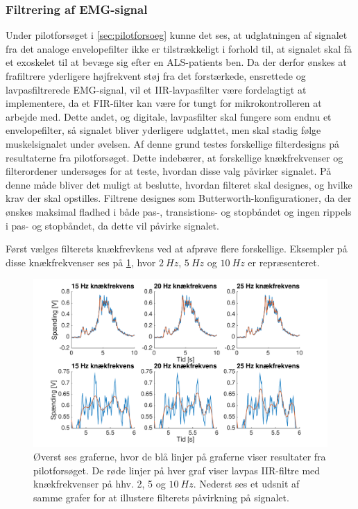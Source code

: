 \subsubsection{Filtrering af EMG-signal} \label{sec:lavpas_krav}
Under pilotforsøget i \autoref{sec:pilotforsoeg} kunne det ses, at udglatningen af signalet fra det analoge envelopefilter ikke er tilstrækkeligt i forhold til, at signalet skal få et exoskelet til at bevæge sig efter en ALS-patients ben. Da der derfor ønskes at frafiltrere yderligere højfrekvent støj fra det forstærkede, ensrettede og lavpasfiltrerede EMG-signal, vil et IIR-lavpasfilter være fordelagtigt at implementere, da et FIR-filter kan være for tungt for mikrokontrolleren at arbejde med. Dette andet, og digitale, lavpasfilter skal fungere som endnu et envelopefilter, så signalet bliver yderligere udglattet, men skal stadig følge muskelsignalet under øvelsen.
Af denne grund testes forskellige filterdesigns på resultaterne fra pilotforsøget. Dette indebærer, at forskellige knækfrekvenser og filterordener undersøges for at teste, hvordan disse valg påvirker signalet. På denne måde bliver det muligt at beslutte, hvordan filteret skal designes, og hvilke krav der skal opstilles. Filtrene designes som Butterworth-konfigurationer, da der ønskes maksimal fladhed i både pas-, transistions- og stopbåndet og ingen rippels i pas- og stopbåndet, da dette vil påvirke signalet.

Først vælges filterets knækfrevkens ved at afprøve flere forskellige. Eksempler på disse knækfrekvenser ses på \ref{fig:lp_knaek}, hvor $2~Hz$, $5~Hz$ og $10~Hz$ er repræsenteret. 

\begin{figure} [H]
\centering
\includegraphics[width=1.0\textwidth]{figures/problemloesning/lavpas_knaek.pdf}
\caption{Øverst ses graferne, hvor de blå linjer på graferne viser resultater fra pilotforsøget. De røde linjer på hver graf viser lavpas IIR-filtre med knækfrekvenser på hhv. 2, 5 og $10~Hz$. Nederst ses et udsnit af samme grafer for at illustere filterets påvirkning på signalet.}
\label{fig:lp_knaek}
\end{figure} 

